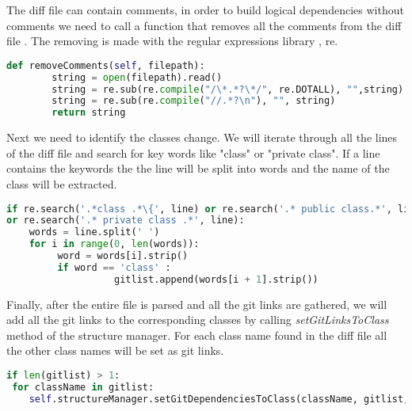 The diff file can contain comments, in order to build logical dependencies without comments we need to call a function that removes all the comments from the diff file . The removing is made with the regular expressions library , re.
\begin{lstlisting}[language=python, caption={Remove comments from file.}]
def removeComments(self, filepath):
        string = open(filepath).read()
        string = re.sub(re.compile("/\*.*?\*/", re.DOTALL), "",string) 
        string = re.sub(re.compile("//.*?\n"), "", string)  
        return string
\end{lstlisting}

Next we need to identify the classes change. We will iterate through all the lines of the diff file and search for key words like "class" or "private class". If a line contains the keywords the the line will be split into words and the name of the class will be extracted.

\begin{lstlisting}[language=python, caption={Get classes changed from the diff file.}]
if re.search('.*class .*\{', line) or re.search('.* public class.*', line) 
or re.search('.* private class .*', line):
    words = line.split(' ')
    for i in range(0, len(words)):
         word = words[i].strip()
         if word == 'class' :
                   gitlist.append(words[i + 1].strip())
\end{lstlisting}

Finally, after the entire file is parsed and all the git links are gathered, we will add all the git links to the corresponding classes by calling \textit{setGitLinksToClass} method of the structure manager. For each class name found in the diff file all the other class names will be set as git links.
\begin{lstlisting}[language=python, caption={StructureManager call to set the git links.}]
if len(gitlist) > 1:
 for className in gitlist:
    self.structureManager.setGitDependenciesToClass(className, gitlist, nrOfCommits)
\end{lstlisting}

